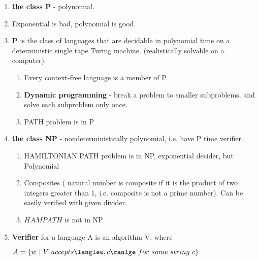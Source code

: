 \documentclass{article}
\newcommand{\imp}[1]{\textbf{#1}}
\begin{document}
\begin{enumerate}[1., leftmargin = 0.6cm]
\item \imp{the class P} - polynomial.
\item Exponential is bad, polynomial is good.
\item \imp{P} is the class of languages that are decidable in polynomial time on a
deterministic single tape Turing machine. (realistically solvable on a computer).
    \begin{enumerate}[1., leftmargin = 0.6cm]
    \itemsep0em
    \item Every context-free language is a member of P.
    \item \imp{Dynamic programming} - break a problem to smaller subproblems, and solve
    each subproblem only once.
    \item PATH problem is in P
    \end{enumerate}
\item \imp{the class NP} - nondeterministically polynomial, i.e. have P time verifier.
    \begin{enumerate}[1., leftmargin = 0.6cm]
    \itemsep0em
    \item HAMILTONIAN PATH problem is in NP, exponential decider, but Polynomial
    \item Composites ( natural number is composite if it is the product of two integers
    greater than 1, i.e. composite is not a prime number). Can be easily verified with
    given divider.
    \item $\overline{HAMPATH}$ is not in NP
    \end{enumerate}
\item \imp{Verifier} for a language A is an algorithm V, where

\begin{centering}
    $A = \{ w\ |\ V\ accepts \langlew,c\ranlge\ for\ some\ string\ c\}$\\
\end{centering}


\end{enumerate}
\end{document}

